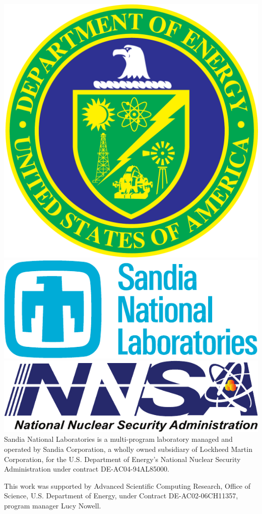 \documentclass[conference]{IEEEtran}
\begin{document}
\includegraphics[scale=0.07]{logos/doe_logo}
\includegraphics[scale=0.30]{logos/snl_logo}
\includegraphics[scale=0.35]{logos/nnsa_logo}
Sandia National Laboratories is a multi-program laboratory managed and operated
by Sandia Corporation, a wholly owned subsidiary of Lockheed Martin
Corporation, for the U.S. Department of Energy's National Nuclear Security
Administration under contract DE-AC04-94AL85000.

This work was supported by Advanced Scientific Computing Research, Office of
Science, U.S. Department of Energy, under Contract DE-AC02-06CH11357, program
manager Lucy Nowell.




\vfill\eject
\end{document}
